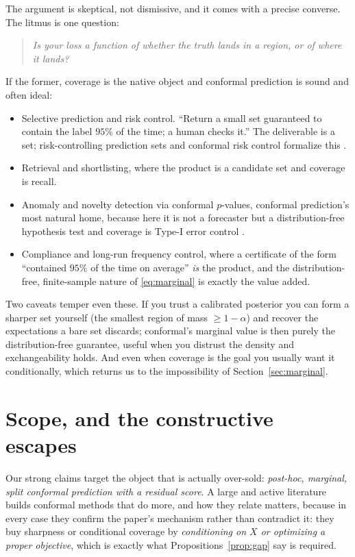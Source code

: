 \documentclass[11pt]{article}
\theoremstyle{definition}
\begin{document}
The argument is skeptical, not dismissive, and it comes with a precise converse. The
litmus is one question:
\begin{quote}
\emph{Is your loss a function of \emph{whether} the truth lands in a region, or of
\emph{where} it lands?}
\end{quote}
If the former, coverage is the native object and conformal prediction is sound and often
ideal:
\begin{itemize}
  \item Selective prediction and risk control. ``Return a small set guaranteed
  to contain the label $95\%$ of the time; a human checks it.'' The deliverable is a set;
  risk-controlling prediction sets and conformal risk control formalize this
  \citep{angelopoulos2021uncertainty, bates2021distribution, angelopoulos2024conformalrisk}.
  \item Retrieval and shortlisting, where the product is a candidate set and
  coverage is recall.
  \item Anomaly and novelty detection via conformal $p$-values, conformal
  prediction's most natural home, because here it is not a forecaster but a
  distribution-free hypothesis test and coverage is Type-I error control
  \citep{vovk2005algorithmic}.
  \item Compliance and long-run frequency control, where a certificate of the
  form ``contained $95\%$ of the time on average'' \emph{is} the product, and the
  distribution-free, finite-sample nature of \eqref{eq:marginal} is exactly the value
  added.
\end{itemize}
Two caveats temper even these. If you trust a calibrated posterior you can form a
sharper set yourself (the smallest region of mass $\ge 1-\alpha$) and recover the
expectations a bare set discards; conformal's marginal value is then purely the
distribution-free guarantee, useful when you distrust the density and exchangeability
holds. And even when coverage is the goal you usually want it conditionally, which
returns us to the impossibility of Section~\ref{sec:marginal}.

\section{Scope, and the constructive escapes}\label{sec:scope}

Our strong claims target the object that is actually over-sold: \emph{post-hoc, marginal,
split conformal prediction with a residual score}. A large and active literature builds
conformal methods that do more, and how they relate matters, because
in every case they confirm the paper's mechanism rather than contradict it: they buy
sharpness or conditional coverage by \emph{conditioning on $X$ or optimizing a proper
objective}, which is exactly what Propositions~\ref{prop:gap} say is required.
\end{document}
